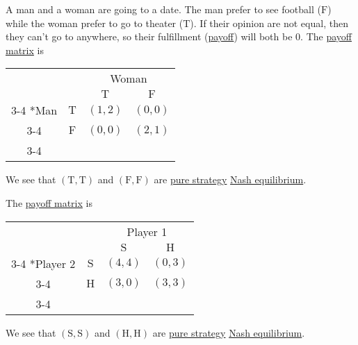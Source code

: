 \begin{eg}\label{eg:battle-of-the-sexes}
	A man and a woman are going to a date. The man prefer to see football (\(\mathrm{F}\)) while the woman prefer to go to theater (\(\mathrm{T}\)). If
	their opinion are not equal, then they can't go to anywhere, so their fulfillment (\hyperref[def:reward]{payoff}) will both be \(0\).
	The \hyperref[def:payoff-matrix]{payoff matrix}
	is
	\begin{table}[H]
		\centering
		\setlength{\extrarowheight}{2pt}
		\begin{tabular}{cc|c|c|}
			                   & \multicolumn{1}{c}{} & \multicolumn{2}{c}{Woman}                                           \\
			                   & \multicolumn{1}{c}{} & \multicolumn{1}{c}{$\mathrm{T}$} & \multicolumn{1}{c}{$\mathrm{F}$} \\\cline{3-4}
			\multirow{2}*{Man} & $\mathrm{T}$         & $(1, 2)$                         & $(0, 0)$                         \\\cline{3-4}
			                   & $\mathrm{F}$         & $(0, 0)$                         & $(2, 1)$                         \\\cline{3-4}
		\end{tabular}
	\end{table}
	We see that \((\mathrm{T}, \mathrm{T})\) and \((\mathrm{F}, \mathrm{F})\) are \hyperref[def:pure-strategy]{pure strategy} \hyperref[def:Nash-equilibrium]{Nash equilibrium}.
\end{eg}

\begin{eg}\label{eg:stay-hunt}
	The \hyperref[def:payoff-matrix]{payoff matrix} is
	\begin{table}[H]
		\centering
		\setlength{\extrarowheight}{2pt}
		\begin{tabular}{cc|c|c|}
			                        & \multicolumn{1}{c}{} & \multicolumn{2}{c}{Player 1}                                        \\
			                        & \multicolumn{1}{c}{} & \multicolumn{1}{c}{$\mathrm{S}$} & \multicolumn{1}{c}{$\mathrm{H}$} \\\cline{3-4}
			\multirow{2}*{Player 2} & $\mathrm{S}$         & $(4, 4)$                         & $(0, 3)$                         \\\cline{3-4}
			                        & $\mathrm{H}$         & $(3, 0)$                         & $(3, 3)$                         \\\cline{3-4}
		\end{tabular}
	\end{table}
	We see that \((\mathrm{S}, \mathrm{S})\) and \((\mathrm{H}, \mathrm{H})\) are \hyperref[def:pure-strategy]{pure strategy} \hyperref[def:Nash-equilibrium]{Nash equilibrium}.
\end{eg}

